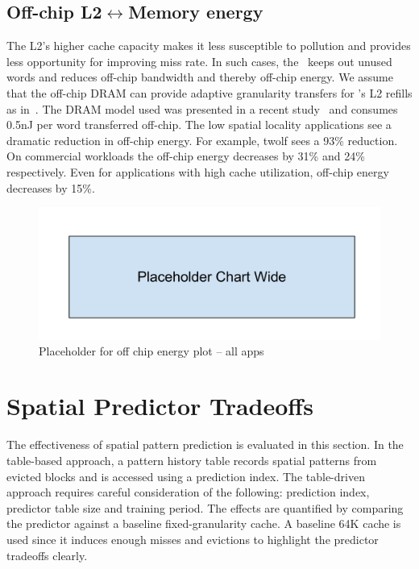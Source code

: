 {{\subsection{Off-chip L2$\leftrightarrow$Memory energy}
The L2's higher cache capacity makes it less susceptible to pollution and provides less opportunity for improving miss rate. In such cases, the \AC\ keeps out unused words and reduces off-chip bandwidth and thereby off-chip energy. We assume that the off-chip DRAM can provide adaptive granularity transfers for \AC{}'s L2 refills as in~\cite{Yoon_Jeong_Erez_2011}. The DRAM model used was presented in a recent study~\cite{exascale} and consumes 0.5nJ per word transferred off-chip. The low spatial locality applications see a dramatic reduction in off-chip energy. For example, twolf sees a 93\% reduction. On commercial workloads the off-chip energy decreases by 31\% and 24\% respectively. Even for applications with high cache utilization, off-chip energy decreases by 15\%.

\begin{figure}[h]
  \centering
  \includegraphics[width=\textwidth]{files/Figures/Placeholder_Chart_Wide.pdf}
  \caption{Placeholder for off chip energy plot -- all apps}
  \label{fig:offchip_energy}
\end{figure}


\section{Spatial Predictor Tradeoffs}
\label{sec:spatial_predictor_tradeoffs}

The effectiveness of spatial pattern prediction is evaluated in this section. In the table-based approach, a pattern history table records spatial patterns from evicted blocks and is accessed using a prediction index. The table-driven approach requires careful consideration of the following: prediction index, predictor table size and training period. The effects are quantified by comparing the predictor against a baseline fixed-granularity cache. A baseline 64K cache is used since it induces enough misses and evictions to highlight the predictor tradeoffs clearly.

}}
